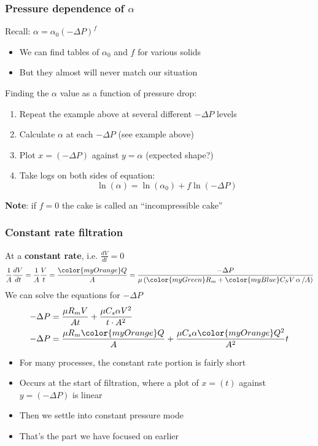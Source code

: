 \begin{frame}\frametitle{Pressure dependence of $\alpha$}
	Recall: $\alpha = \alpha_\text{0} \left(-\Delta P\right)^f$
	\begin{itemize}
		\item	We can find tables of $\alpha_\text{0}$ and $f$ for various solids
		\item	But they almost will never match our situation
	\end{itemize}
	
	
	\vspace{12pt}
	Finding the $\alpha$ value as a function of pressure drop:
	\begin{enumerate}
		\item	Repeat the example above at several different $-\Delta P$ levels
		\item	Calculate $\alpha$ at each $-\Delta P$ \hfill {\color{myOrange}(see example above)}
		\item	Plot $x=(-\Delta P)$ against $y = \alpha$ \hfill {\color{myOrange}(expected shape?)}
		\item	Take logs on both sides of equation:
		\[
			\ln{\left(\alpha\right)} = \ln{\left(\alpha_\text{0}\right)} + f \ln{\left(-\Delta P\right)}
		\]
	\end{enumerate}
	\textbf{Note}: if $f=0$ the cake is called an ``{\color{purple}incompressible cake}''
\end{frame}

\begin{frame}\frametitle{Constant rate filtration}
	At a \textbf{constant rate}, i.e. $\frac{dV}{dt} = 0$
	\[ \dfrac{1}{A} \dfrac{dV}{dt} = \dfrac{1}{A} \dfrac{V}{t} = \dfrac{{\color{myOrange}Q}}{A} = \dfrac{-\Delta P}{\mu \left({\color{myGreen}R_m} + {\color{myBlue}C_S V  \, \mathbf{ \alpha}\, / A} \right)}	\]
	We can solve the equations for $-\Delta P$
	\begin{align*}
		-\Delta P &= \dfrac{\mu R_m V}{A t} + \dfrac{\mu C_s \alpha V^2}{t \cdot A^2}\\
		-\Delta P &= \dfrac{\mu R_m {\color{myOrange}Q}}{A} + \dfrac{\mu C_s \alpha {\color{myOrange}Q^2}}{A^2}t
	\end{align*}
	\begin{itemize}
		\item	For many processes, the constant rate portion is fairly short
		\item	Occurs at the start of filtration, where a plot of $x = (t)$ against $y = (-\Delta P)$ is linear
		\item	Then we settle into constant pressure mode
		\item	That's the part we have focused on earlier
	\end{itemize}
\end{frame}

